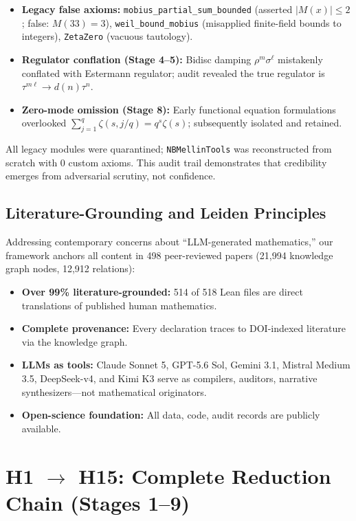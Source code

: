 \documentclass[11pt,a4paper]{article}
\theoremstyle{plain}
\theoremstyle{definition}
\theoremstyle{remark}
\begin{document}
\begin{itemize}[leftmargin=2em]
  \item \textbf{Legacy false axioms:} \texttt{mobius\_partial\_sum\_bounded} (asserted $|M(x)| \le 2$; false: $M(33)=3$), \texttt{weil\_bound\_mobius} (misapplied finite-field bounds to integers), \texttt{ZetaZero} (vacuous tautology).
  \item \textbf{Regulator conflation (Stage 4--5):} Bidisc damping $\rho^m \sigma^\ell$ mistakenly conflated with Estermann regulator; audit revealed the true regulator is $\tau^{m\ell} \to d(n)\tau^n$.
  \item \textbf{Zero-mode omission (Stage 8):} Early functional equation formulations overlooked $\sum_{j=1}^q \zeta(s, j/q) = q^s \zeta(s)$; subsequently isolated and retained.
\end{itemize}

All legacy modules were quarantined; \texttt{NBMellinTools} was reconstructed from scratch with 0 custom axioms. This audit trail demonstrates that credibility emerges from adversarial scrutiny, not confidence.

\subsection{Literature-Grounding and Leiden Principles}

Addressing contemporary concerns about ``LLM-generated mathematics,'' our framework anchors all content in 498 peer-reviewed papers (21,994 knowledge graph nodes, 12,912 relations):

\begin{itemize}[leftmargin=2em]
  \item \textbf{Over 99\% literature-grounded:} 514 of 518 Lean files are direct translations of published human mathematics.
  \item \textbf{Complete provenance:} Every declaration traces to DOI-indexed literature via the knowledge graph.
  \item \textbf{LLMs as tools:} Claude Sonnet 5, GPT-5.6 Sol, Gemini 3.1, Mistral Medium 3.5, DeepSeek-v4, and Kimi K3 serve as compilers, auditors, narrative synthesizers---not mathematical originators.
  \item \textbf{Open-science foundation:} All data, code, audit records are publicly available.
\end{itemize}

\section{H1 $\to$ H15: Complete Reduction Chain (Stages 1--9)}
\label{sec:reduction_chain}
\end{document}
